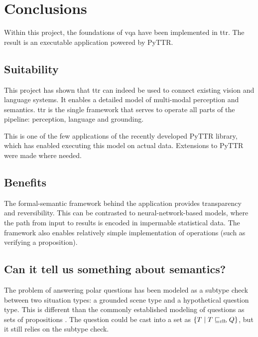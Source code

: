 \renewcommand{\sectionautorefname}{Section}
\let\subsectionautorefname\sectionautorefname
\let\subsubsectionautorefname\sectionautorefname
\glsresetall
\section{Conclusions}
\label{sec:conclusions}

Within this project, the foundations of \gls{vqa} have been implemented in \gls{ttr}.
The result is an executable application powered by PyTTR.



\subsection{Suitability}

This project has shown that \gls{ttr} can indeed be used to connect existing vision and language systems.
It enables a detailed model of multi-modal perception and semantics.
\Gls{ttr} is the single framework that serves to operate all parts of the pipeline: perception, language and grounding.

This is one of the few applications of the recently developed PyTTR library, which has enabled executing this model on actual data.
Extensions to PyTTR were made where needed.



\subsection{Benefits}

The formal-semantic framework behind the application provides transparency and reversibility.
This can be contrasted to neural-network-based models, where the path from input to results is encoded in impermable statistical data.
The framework also enables relatively simple implementation of operations (such as verifying a proposition).



\subsection{Can it tell us something about semantics?}

The problem of answering polar questions has been modeled as a subtype check between two situation types: a grounded scene type and a hypothetical question type.
This is different than the commonly established modeling of questions as sets of propositions \citep{HamblinQuestionsMontagueEnglish1973}.
The question could be cast into a set as $\{T \mathrel{|} T \mathrel{\sqsubseteq_\text{rlb}} Q\}$, but it still relies on the subtype check.



